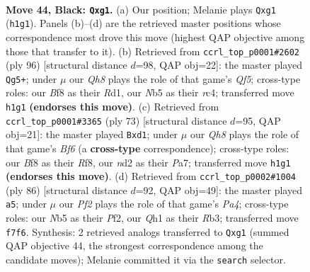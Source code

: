 \documentclass[11pt]{article}
\begin{document}
\clearpage

\begin{figure}[p]\centering
\begin{subfigure}{0.46\textwidth}\centering
\resizebox{\linewidth}{!}{%
\newchessgame
\chessboard[
  setfen={1r3b1k/1r3p2/2Q5/1n2pR2/R3P3/3K4/3N2N1/6Bq b - - 0 44},
  showmover=false,
  pgfstyle=straightmove, color=movearrow, markmove={h1-g1}
]}
\caption{}
\end{subfigure}\hfill
\begin{subfigure}{0.46\textwidth}\centering
\resizebox{\linewidth}{!}{%
\newchessgame
\chessboard[
  setfen={8/5pk1/2q5/P1pn1Q2/2r5/6P1/R4P1r/1K1R4 w - - 0 49},
  showmover=false,
  pgfstyle=straightmove, color=movearrow, markmove={f5-g5}
]}
\caption{}
\end{subfigure}
\\[4pt]
\begin{subfigure}{0.46\textwidth}\centering
\resizebox{\linewidth}{!}{%
\newchessgame
\chessboard[
  setfen={2kr1r2/pp6/8/6Q1/2P2N1p/3p1b2/PP6/K2R4 b - - 0 37},
  showmover=false,
  pgfstyle=straightmove, color=movearrow, markmove={f3-d1}
]}
\caption{}
\end{subfigure}\hfill
\begin{subfigure}{0.46\textwidth}\centering
\resizebox{\linewidth}{!}{%
\newchessgame
\chessboard[
  setfen={1r6/rPN5/1R6/4p1k1/P3pp2/1R1n4/5P2/6K1 w - - 0 44},
  showmover=false,
  pgfstyle=straightmove, color=movearrow, markmove={a4-a5}
]}
\caption{}
\end{subfigure}
\caption{\textbf{Move 44, Black: \texttt{Qxg1}.} (a) Our position; Melanie plays \texttt{Qxg1} (\texttt{h1g1}). Panels (b)--(d) are the retrieved master positions whose correspondence most drove this move (highest QAP objective among those that transfer to it). (b) Retrieved from \texttt{ccrl\_top\_p0001\#2602} (ply 96) [structural distance $d$=98, QAP obj=22]: the master played \texttt{Qg5+}; under $\mu$ our \emph{Qh8} plays the role of that game's \emph{Qf5}; cross-type roles: our \emph{B}f8 as their \emph{R}d1, our \emph{N}b5 as their \emph{r}c4; transferred move \texttt{h1g1} \textbf{(endorses this move)}. (c) Retrieved from \texttt{ccrl\_top\_p0001\#3365} (ply 73) [structural distance $d$=95, QAP obj=21]: the master played \texttt{Bxd1}; under $\mu$ our \emph{Qh8} plays the role of that game's \emph{Bf6} (a \textbf{cross-type} correspondence); cross-type roles: our \emph{B}f8 as their \emph{R}f8, our \emph{n}d2 as their \emph{P}a7; transferred move \texttt{h1g1} \textbf{(endorses this move)}. (d) Retrieved from \texttt{ccrl\_top\_p0002\#1004} (ply 86) [structural distance $d$=92, QAP obj=49]: the master played \texttt{a5}; under $\mu$ our \emph{Pf2} plays the role of that game's \emph{Pa4}; cross-type roles: our \emph{N}b5 as their \emph{P}f2, our \emph{Q}h1 as their \emph{R}b3; transferred move \texttt{f7f6}. Synthesis: 2 retrieved analogs transferred to \texttt{Qxg1} (summed QAP objective 44, the strongest correspondence among the candidate moves); Melanie committed it via the \texttt{search} selector.}
\label{fig:thought-m87}
\end{figure}
\end{document}
